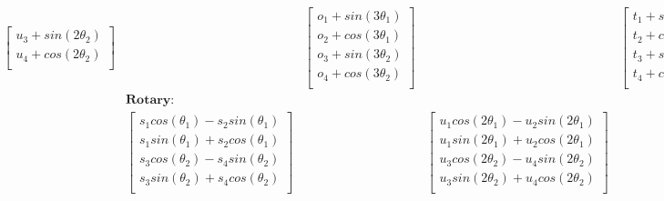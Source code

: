 \documentclass{article}
\begin{document}
\begin{align*}
\begin{bmatrix}
        u_3 + sin(2\theta_2)\\
        u_4 + cos(2\theta_2)\\
    \end{bmatrix}
    &&\begin{bmatrix}
        o_1 + sin(3\theta_1)\\
        o_2 + cos(3\theta_1)\\
        o_3 + sin(3\theta_2)\\
        o_4 + cos(3\theta_2)\\
    \end{bmatrix}
    &&\begin{bmatrix}
        t_1 + sin(4\theta_1)\\
        t_2 + cos(4\theta_1)\\
        t_3 + sin(4\theta_2)\\
        t_4 + cos(4\theta_2)\\
    \end{bmatrix} \\
    &\textbf{Rotary:} \\
    &\begin{bmatrix}
        s_1 cos(\theta_1) - s_2 sin(\theta_1) \\
        s_1 sin(\theta_1) + s_2 cos(\theta_1) \\
        s_3 cos(\theta_2) - s_4 sin(\theta_2) \\
        s_3 sin(\theta_2) + s_4 cos(\theta_2) \\
    \end{bmatrix}
    &&\begin{bmatrix}
        u_1 cos(2\theta_1) - u_2 sin(2\theta_1) \\
        u_1 sin(2\theta_1) + u_2 cos(2\theta_1) \\
        u_3 cos(2\theta_2) - u_4 sin(2\theta_2) \\
        u_3 sin(2\theta_2) + u_4 cos(2\theta_2) \\
    \end{bmatrix}
    &&\begin{bmatrix}
        o_1 cos(3\theta_1) - o_2 sin(3\theta_1) \\
        o_1 sin(3\theta_1) + o_2 cos(3\theta_1) \\
        o_3 cos(3\theta_2) - o_4 sin(3\theta_2) \\
        o_3 sin(3\theta_2) + o_4 cos(3\theta_2) \\
    \end{bmatrix}
    &&\begin{bmatrix}
        t_1 cos(4\theta_1) - t_2 sin(4\theta_1) \\
        t_1 sin(4\theta_1) + t_2 cos(4\theta_1) \\
        t_3 cos(4\theta_2) - t_4 sin(4\theta_2) \\
        t_3 sin(4\theta_2) + t_4 cos(4\theta_2) \\
    \end{bmatrix} \\
\end{align*}
\end{document}
